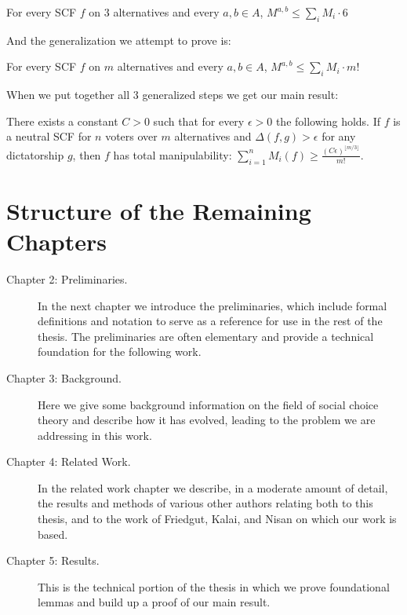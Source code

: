 	\begin{lemma}
		For every SCF $f$ on $3$ alternatives and every $a,b \in A$, $M^{a,b} \le \sum_i M_i \cdot 6$
	\end{lemma}

	And the generalization we attempt to prove is:

	\begin{lemma}
		For every SCF $f$ on $m$ alternatives and every $a,b \in A$, $M^{a,b} \le \sum_i M_i \cdot m!$
	\end{lemma}

	When we put together all 3 generalized steps we get our main result:
	\begin{theorem}
		There exists a constant $C > 0$ such that for every $\epsilon > 0$ the following holds. If $f$ is a neutral SCF for $n$ voters over $m$ alternatives and $\Delta(f, g) > \epsilon$ for any dictatorship $g$, then $f$ has total manipulability: $\sum^n_{i=1} M_i(f) \ge \frac{(C\epsilon)^{\lfloor m/3 \rfloor}}{m!}$.
	\end{theorem}


\section{Structure of the Remaining Chapters}

	\begin{description}
		\item[Chapter 2: Preliminaries.] In the next chapter we introduce the preliminaries, which include formal definitions and notation to serve as a reference for use in the rest of the thesis. The preliminaries are often elementary and provide a technical foundation for the following work.

		\item[Chapter 3: Background.] Here we give some background information on the field of social choice theory and describe how it has evolved, leading to the problem we are addressing in this work.

		\item[Chapter 4: Related Work.] In the related work chapter we describe, in a moderate amount of detail, the results and methods of various other authors relating both to this thesis, and to the work of Friedgut, Kalai, and Nisan on which our work is based.

		\item[Chapter 5: Results.] This is the technical portion of the thesis in which we prove foundational lemmas and build up a proof of our main result.
	\end{description}
